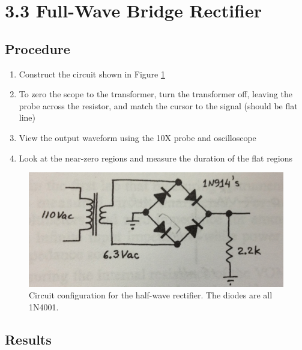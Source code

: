 \documentclass[12pt,letterpaper]{report}
\newlength \figwidth
\begin{document}
\section*{3.3 Full-Wave Bridge Rectifier}
\subsection*{Procedure}

\begin{enumerate}
\item Construct the circuit shown in Figure \ref{fig:circuit_2}
\item To zero the scope to the transformer, turn the transformer off, leaving the probe across the resistor, and match the cursor to the signal (should be flat line)
\item View the output waveform using the 10X probe and oscilloscope
\item Look at the near-zero regions and measure the duration of the flat regions
\end{enumerate}

\begin{figure}[H]
\centering
\includegraphics[width=\figwidth, keepaspectratio=true]{lab4/circuit_2.jpg}
\caption{Circuit configuration for the half-wave rectifier. The diodes are all 1N4001.}
\label{fig:circuit_2}
\end{figure}

\subsection*{Results}
\end{document}

